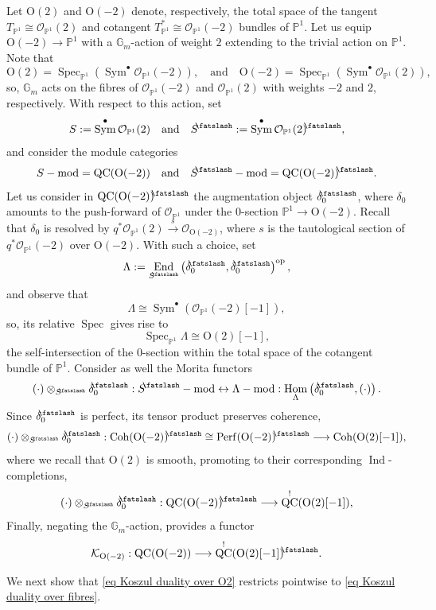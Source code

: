 \documentclass[11pt, a4paper]{amsart}
\numberwithin{equation}{section}
\theoremstyle{definition}
\theoremstyle{remark}
\DeclareMathOperator{\Hom}{Hom}
\DeclareMathOperator{\End}{End}
\DeclareMathOperator{\Spec}{Spec}
\DeclareMathOperator{\Coh}{Coh}
\DeclareMathOperator{\Sym}{Sym}
\DeclareMathOperator{\Perf}{Perf}
\DeclareMathOperator{\QC}{QC}
\newcommand{\shear}{{\mathbin{\mkern-6mu\fatslash}}}
\DeclareMathOperator{\Ind}{\mathrm{Ind}}
\newcommand{\Kk}{\mathcal{K}}
\newcommand{\Oo}{\mathcal{O}}
\renewcommand{\O}{\mathrm{O}}
\newcommand{\GG}{\mathbb{G}}
\newcommand{\PP}{\mathbb{P}}
\renewcommand{\to}{\longrightarrow}
\begin{document}
Let $\O(2)$ and $\O(-2)$ denote, respectively, the total space of the tangent $T_{\PP^1} \cong \Oo_{\PP^1}(2)$ and cotangent $T^*_{\PP^1} \cong \Oo_{\PP^1}(-2)$ bundles of $\PP^1$. Let us equip $\O(-2) \to \PP^1$ with a $\GG_m$-action of weight $2$ extending to the trivial action on $\PP^1$. Note that 
\[
\O(2) = \Spec_{\PP^1} \left ( \Sym^\bullet \Oo_{\PP^1}(-2) \right ), \quad \text{and} \quad \O(-2) = \Spec_{\PP^1} \left ( \Sym^\bullet \Oo_{\PP^1}(2) \right ),
\]
so, $\GG_m$ acts on the fibres of $\Oo_{\PP^1}(-2)$ and $\Oo_{\PP^1}(2)$ with weights $-2$ and $2$, respectively. With respect to this action, set
\[
S := \Sym^\bullet \Oo_{\PP^1}(2) \quad \text{and} \quad S^{\shear} := \Sym^\bullet \Oo_{\PP^1}(2)^{\shear},
\]
and consider the module categories
\[
S-\mathrm{mod} = \QC(\O(-2)) \quad \text{and} \quad S^{\shear}-\mathrm{mod} = \QC(\O(-2))^{\shear}.
\]
Let us consider in $\QC(\O(-2))^{\shear}$ the augmentation object $\delta_0^{\shear}$, where $\delta_0$ amounts to the push-forward of $\Oo_{\PP^1}$ under the $0$-section $\PP^1 \to \O(-2)$. Recall that $\delta_0$ is resolved by $q^*\Oo_{\PP^1}(2) \stackrel{s}{\to} \Oo_{\O(-2)}$, where $s$ is the tautological section of $q^*\Oo_{\PP^1}(-2)$ over $\O(-2)$. With such a choice, set
\[
\Lambda := \End_{S^{\shear}} \left (\delta_0^{\shear}, \delta_0^{\shear} \right )^{\mathrm{op}}, 
\]
and observe that 
\[
\Lambda \cong \Sym^\bullet \left ( \Oo_{\PP^1}(-2)[-1] \right ), 
\]
so, its relative $\Spec$ gives rise to
\[
\Spec_{\PP^1} \Lambda \cong \O(2)[-1],
\]
the self-intersection of the $0$-section within the total space of the cotangent bundle of $\PP^1$. Consider as well the Morita functors
\[
(\cdot) \otimes_{S^{\shear}} \delta_0^{\shear} : S^{\shear}-\mathrm{mod} \leftrightarrow \Lambda-\mathrm{mod} : \Hom_{\Lambda}\left (\delta_0^{\shear}, (\cdot) \right ).
\]
Since $\delta_0^{\shear}$ is perfect, its tensor product preserves coherence,
\[
(\cdot) \otimes_{S^{\shear}} \delta_0^{\shear} : \Coh(\O(-2))^{\shear} \cong \Perf(\O(-2))^{\shear} \to \Coh(\O(2)[-1]),
\]
where we recall that $\O(2)$ is smooth, promoting to their corresponding $\Ind$-completions,
\[
(\cdot) \otimes_{S^{\shear}} \delta_0^{\shear} : \QC(\O(-2))^{\shear} \to \QC^!(\O(2)[-1]),
\]
Finally, negating the $\GG_m$-action, provides a functor
\begin{equation} \label{eq Koszul duality over O2}
\Kk_{\O(-2)} : \QC(\O(-2)) \to \QC^!(\O(2)[-1])^{\shear}.
\end{equation} 


We next show that \eqref{eq Koszul duality over O2} restricts pointwise to \eqref{eq Koszul duality over fibres}.
\end{document}

